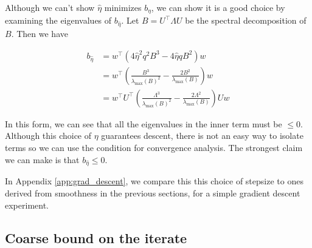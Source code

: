 \documentclass[11pt]{article}
\begin{document}
Although we can't show $\hat{\eta}$ minimizes $b_{\eta}$, we can show it is a good choice by examining the eigenvalues of $b_{\hat{\eta}}$. Let $B = U^{\top} \Lambda U$ be the spectral decomposition of $B$. Then we have

\begin{align*}
    b_{\hat{\eta}} &= w^{\top} ( 4 \hat{\eta}^2 q^2 B^3 - 4 \hat{\eta} q B^2)w \\
    &= w^{\top} \left( \frac{B^3}{\lambda_{\max}(B)^2} - \frac{2 B^2}{\lambda_{\max}(B)} \right) w \\
    &= w^{\top} U^{\top} \left( \frac{\Lambda^3}{\lambda_{\max}(B)^2} - \frac{2 \Lambda^2}{\lambda_{\max}(B)} \right) Uw
\end{align*}

In this form, we can see that all the eigenvalues in the inner term must be $\leq 0$. Although this choice of $\eta$ guarantees descent, there is not an easy way to isolate terms so we can use the condition for convergence analysis. The strongest claim we can make is that $b_{\hat{\eta}} \leq 0$.

In Appendix \ref{app:grad_descent}, we compare this this choice of stepsize to ones derived from smoothness in the previous sections, for a simple gradient descent experiment.




\subsection{Coarse bound on the iterate}
\end{document}
